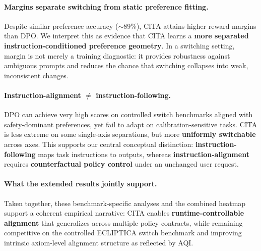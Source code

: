\paragraph{\textbf{Margins separate switching from static preference fitting.}}
Despite similar preference accuracy ($\sim$89\%), \textsc{CITA} attains higher reward margins than DPO.
We interpret this as evidence that \textsc{CITA} learns a \textbf{more separated instruction-conditioned preference geometry}.
In a switching setting, margin is not merely a training diagnostic: it provides robustness against ambiguous prompts and reduces the chance that switching collapses into weak, inconsistent changes.

\paragraph{\textbf{Instruction-alignment $\neq$ instruction-following.}}
DPO can achieve very high scores on controlled switch benchmarks aligned with safety-dominant preferences, yet fail to adapt on calibration-sensitive tasks.
\textsc{CITA} is less extreme on some single-axis separations, but more \textbf{uniformly switchable} across axes.
This supports our central conceptual distinction:
\textbf{instruction-following} maps task instructions to outputs,
whereas \textbf{instruction-alignment} requires \textbf{counterfactual policy control} under an unchanged user request.

\vspace{-0.2em}
\paragraph{\textbf{What the extended results jointly support.}}
Taken together, these benchmark-specific analyses and the combined heatmap support a coherent empirical narrative:
\textsc{CITA} enables \textbf{runtime-controllable alignment} that generalizes across multiple policy contracts,
while remaining competitive on the controlled ECLIPTICA switch benchmark and improving intrinsic axiom-level alignment structure as reflected by AQI.
    